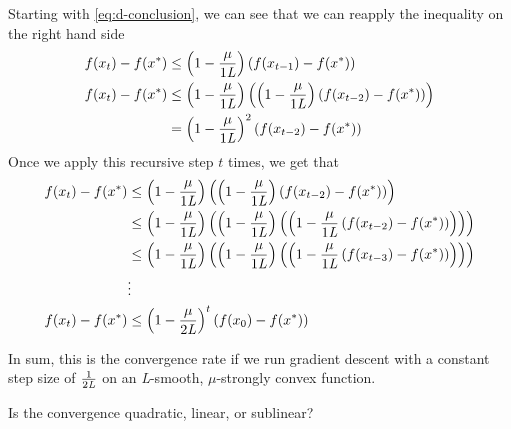 \documentclass{exam}
\begin{document}
\begin{questions}
\begin{parts}
{            Starting with \eqref{eq:d-conclusion}, we can see that we can reapply the inequality on the right hand side
            \begin{align*}
                f(x_t) - f(x^*) & \leq \left(1 - \frac{\mu}{1\emph{L}}\right)\left(f(x_{t - 1}) - f(x^*)\right)                                                     \\
                f(x_t) - f(x^*) & \leq \left(1 - \frac{\mu}{1\emph{L}}\right)\left(\left(1 - \frac{\mu}{1\emph{L}}\right)\left(f(x_{t - 2}) - f(x^*)\right) \right) \\
                                & = \left(1 - \frac{\mu}{1\emph{L}}\right)^2\left(f(x_{t - 2}) - f(x^*)\right)                                                      \\
            \end{align*}
            Once we apply this recursive step $t$ times, we get that
            \begin{align*}
                f(x_t) - f(x^*) & \leq \left(1 - \frac{\mu}{1\emph{L}}\right)\left(\left(1 - \frac{\mu}{1\emph{L}}\right)\left(f(x_{t - 2}) - f(x^*)\right) \right)                                                     \\
                                & \leq \left(1 - \frac{\mu}{1\emph{L}}\right)\left(\left(1 - \frac{\mu}{1\emph{L}}\right)\left(\left(1 - \frac{\mu}{1\emph{L}}\left(f(x_{t - 2}) - f(x^*)\right) \right)\right) \right) \\
                                & \leq \left(1 - \frac{\mu}{1\emph{L}}\right)\left(\left(1 - \frac{\mu}{1\emph{L}}\right)\left(\left(1 - \frac{\mu}{1\emph{L}}\left(f(x_{t - 3}) - f(x^*)\right) \right)\right) \right) \\
                                & \vdots                                                                                                                                                                                \\
                f(x_t) - f(x^*) & \leq \left(1 - \frac{\mu}{2\emph{L}}\right)^t(f(x_0) - f(x^*))
            \end{align*}
        }

        \hr

        {
            In sum, this is the convergence rate if we run gradient descent with a constant step size of $\frac{1}{2\emph{L}}$ on an \emph{L}-smooth, $\mu$-strongly convex function.

            Is the convergence quadratic, linear, or sublinear?

}
\end{parts}
\end{questions}
\end{document}
